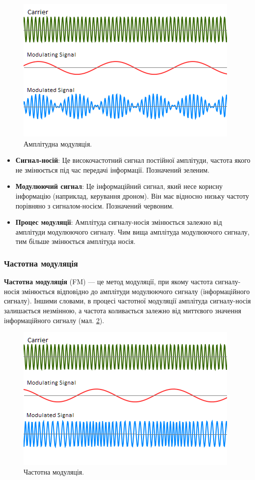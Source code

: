 \documentclass{article}
\begin{document}
\begin{figure}[h!]
\centering
\includegraphics[width=0.6\linewidth]{images/am.png}
\caption{\label{fig:am}Амплітудна модуляція.}
\end{figure}

\begin{itemize}[noitemsep, topsep=8pt]
\item \textbf{Сигнал-носій}: Це високочастотний сигнал постійної амплітуди, частота якого не змінюється під час передачі інформації. Позначений зеленим.
\item \textbf{Модулюючий сигнал}: Це інформаційний сигнал, який несе корисну інформацію (наприклад, керування дроном). Він має відносно низьку частоту порівняно з сигналом-носієм. Позначений червоним.
\item \textbf{Процес модуляції}: Амплітуда сигналу-носія змінюється залежно від амплітуди модулюючого сигналу. Чим вища амплітуда модулюючого сигналу, тим більше змінюється амплітуда носія.
\end{itemize}

\newpage
\subsubsection{Частотна модуляція}

\textbf{Частотна модуляція} (FM) --- це метод модуляції, при якому частота сигналу-носія змінюється відповідно до амплітуди модулюючого сигналу (інформаційного сигналу). Іншими словами, в процесі частотної модуляції амплітуда сигналу-носія залишається незмінною, а частота коливається залежно від миттєвого значення інформаційного сигналу (мал. \ref{fig:fm}).

\begin{figure}[h!]
\centering
\includegraphics[width=0.6\linewidth]{images/fm.png}
\caption{\label{fig:fm}Частотна модуляція.}
\end{figure}
\end{document}
